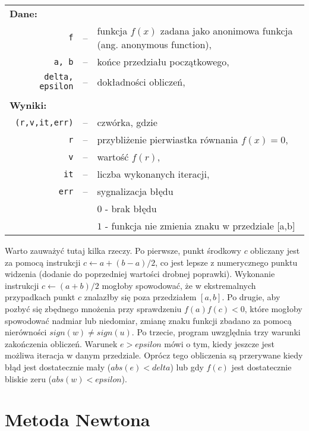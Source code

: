 \documentclass[11pt]{mk-polish-lab-report}
\begin{document}
\begin{longtable}[l]{r  c  l}
\multicolumn{1}{l}{\textbf{Dane:}}&& \\
\texttt{f}&--&funkcja $f(x)$ zadana jako anonimowa funkcja (ang. anonymous function), \\
\texttt{a, b}&--&końce przedziału początkowego, \\
\texttt{delta, epsilon}&--&dokładności obliczeń, \\
&& \\
\multicolumn{1}{l}{\textbf{Wyniki:}}&& \\
\texttt{(r,v,it,err)}&--&czwórka, gdzie \\
\texttt{r}&--&przybliżenie pierwiastka równania $f(x) = 0$, \\
\texttt{v}&--&wartość $f(r)$, \\
\texttt{it}&--&liczba wykonanych iteracji, \\
\texttt{err}&--&sygnalizacja błędu \\
&&$0$ - brak błędu \\
&&$1$ - funkcja nie zmienia znaku w przedziale [a,b] \\
\end{longtable}


\noindent Warto zauważyć tutaj kilka rzeczy. Po pierwsze, punkt środkowy $c$ obliczany jest za pomocą instrukcji $c \leftarrow a + (b - a)/2$, co jest lepsze z numerycznego punktu widzenia (dodanie do poprzedniej wartości drobnej poprawki). Wykonanie instrukcji $c \leftarrow (a + b)/2$ mogłoby spowodować, że w ekstremalnych przypadkach punkt $c$ znalazłby się poza przedziałem $[a, b]$. Po drugie, aby pozbyć się zbędnego mnożenia przy sprawdzeniu $f(a)f(c) < 0$, które mogłoby spowodować nadmiar lub niedomiar, zmianę znaku funkcji zbadano za pomocą nierówności $sign(w) \neq sign(u)$. Po trzecie, program uwzględnia trzy warunki zakończenia obliczeń. Warunek $e > epsilon$ mówi o tym, kiedy jeszcze jest możliwa iteracja w danym przedziale. Oprócz tego obliczenia są przerywane kiedy błąd jest dostatecznie mały ($abs(e) < delta$) lub gdy $f(c)$ jest dostatecznie bliskie zeru ($abs(w) < epsilon$).

\section{Metoda Newtona}
\end{document}
